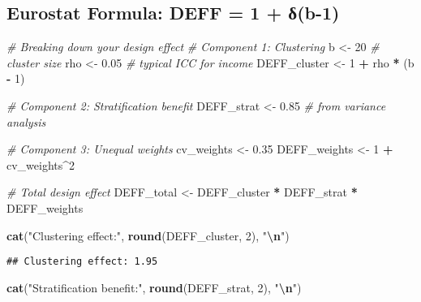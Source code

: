 \documentclass[
]{article}
\newenvironment{Shaded}{\begin{snugshade}}{\end{snugshade}}
\newcommand{\CommentTok}[1]{\textcolor[rgb]{0.56,0.35,0.01}{\textit{#1}}}
\newcommand{\DecValTok}[1]{\textcolor[rgb]{0.00,0.00,0.81}{#1}}
\newcommand{\FloatTok}[1]{\textcolor[rgb]{0.00,0.00,0.81}{#1}}
\newcommand{\FunctionTok}[1]{\textcolor[rgb]{0.13,0.29,0.53}{\textbf{#1}}}
\newcommand{\NormalTok}[1]{#1}
\newcommand{\OtherTok}[1]{\textcolor[rgb]{0.56,0.35,0.01}{#1}}
\newcommand{\SpecialCharTok}[1]{\textcolor[rgb]{0.81,0.36,0.00}{\textbf{#1}}}
\newcommand{\StringTok}[1]{\textcolor[rgb]{0.31,0.60,0.02}{#1}}
\begin{document}
\subsection{Eurostat Formula: DEFF = 1 +
δ(b-1)}\label{eurostat-formula-deff-1-ux3b4b-1}

\begin{Shaded}
\begin{Highlighting}[]
\CommentTok{\# Breaking down your design effect}
\CommentTok{\# Component 1: Clustering}
\NormalTok{b }\OtherTok{\textless{}{-}} \DecValTok{20}  \CommentTok{\# cluster size}
\NormalTok{rho }\OtherTok{\textless{}{-}} \FloatTok{0.05}  \CommentTok{\# typical ICC for income}
\NormalTok{DEFF\_cluster }\OtherTok{\textless{}{-}} \DecValTok{1} \SpecialCharTok{+}\NormalTok{ rho }\SpecialCharTok{*}\NormalTok{ (b }\SpecialCharTok{{-}} \DecValTok{1}\NormalTok{)}

\CommentTok{\# Component 2: Stratification benefit  }
\NormalTok{DEFF\_strat }\OtherTok{\textless{}{-}} \FloatTok{0.85}  \CommentTok{\# from variance analysis}

\CommentTok{\# Component 3: Unequal weights}
\NormalTok{cv\_weights }\OtherTok{\textless{}{-}} \FloatTok{0.35}
\NormalTok{DEFF\_weights }\OtherTok{\textless{}{-}} \DecValTok{1} \SpecialCharTok{+}\NormalTok{ cv\_weights}\SpecialCharTok{\^{}}\DecValTok{2}

\CommentTok{\# Total design effect}
\NormalTok{DEFF\_total }\OtherTok{\textless{}{-}}\NormalTok{ DEFF\_cluster }\SpecialCharTok{*}\NormalTok{ DEFF\_strat }\SpecialCharTok{*}\NormalTok{ DEFF\_weights}

\FunctionTok{cat}\NormalTok{(}\StringTok{"Clustering effect:"}\NormalTok{, }\FunctionTok{round}\NormalTok{(DEFF\_cluster, }\DecValTok{2}\NormalTok{), }\StringTok{"}\SpecialCharTok{\textbackslash{}n}\StringTok{"}\NormalTok{)}
\end{Highlighting}
\end{Shaded}

\begin{verbatim}
## Clustering effect: 1.95
\end{verbatim}

\begin{Shaded}
\begin{Highlighting}[]
\FunctionTok{cat}\NormalTok{(}\StringTok{"Stratification benefit:"}\NormalTok{, }\FunctionTok{round}\NormalTok{(DEFF\_strat, }\DecValTok{2}\NormalTok{), }\StringTok{"}\SpecialCharTok{\textbackslash{}n}\StringTok{"}\NormalTok{)}
\end{Highlighting}
\end{Shaded}
\end{document}
